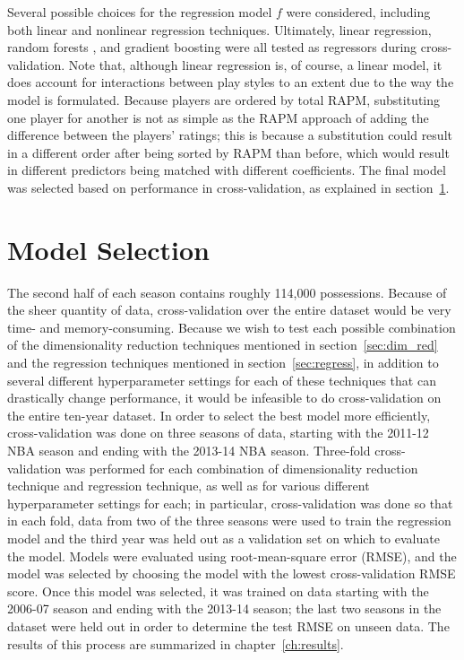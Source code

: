 Several possible choices for the regression model $f$ were considered, including
both linear and nonlinear regression techniques. Ultimately, linear regression,
random forests \cite{RF}, and gradient boosting \cite{GB} were all tested as
regressors during cross-validation. Note that, although linear regression is, of
course, a linear model, it does account for interactions between play styles to an
extent due to the way the model is formulated. Because players are ordered by total
RAPM, substituting one player for another is not as simple as the RAPM approach of
adding the difference between the players' ratings; this is because a substitution
could result in a different order after being sorted by RAPM than before, which
would result in different predictors being matched with different coefficients. The
final model was selected based on performance in cross-validation, as explained in
section~\ref{sec:mod_sel}.

\section{Model Selection}
\label{sec:mod_sel}

The second half of each season contains roughly 114,000 possessions. Because of the
sheer quantity of data, cross-validation over the entire dataset would be very time-
and memory-consuming. Because we wish to test each possible combination of the
dimensionality reduction techniques mentioned in section~\ref{sec:dim_red} and the
regression techniques mentioned in section~\ref{sec:regress}, in addition to several
different hyperparameter settings for each of these techniques that can drastically
change performance, it would be infeasible to do cross-validation on the entire
ten-year dataset. In order to select the best model more efficiently,
cross-validation was done on three seasons of data, starting with the 2011-12 NBA
season and ending with the 2013-14 NBA season.  Three-fold cross-validation was
performed for each combination of dimensionality reduction technique and regression
technique, as well as for various different hyperparameter settings for each; in
particular, cross-validation was done so that in each fold, data from two of the
three seasons were used to train the regression model and the third year was held
out as a validation set on which to evaluate the model. Models were evaluated using
root-mean-square error (RMSE), and the model was selected by choosing the model with
the lowest cross-validation RMSE score. Once this model was selected, it was trained
on data starting with the 2006-07 season and ending with the 2013-14 season; the
last two seasons in the dataset were held out in order to determine the test RMSE on
unseen data. The results of this process are summarized in chapter~\ref{ch:results}.
